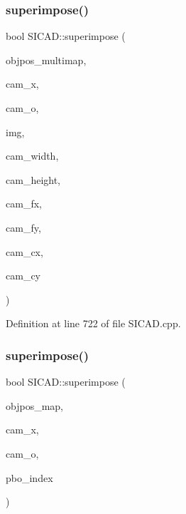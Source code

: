 \subsubsection{\texorpdfstring{superimpose()}{superimpose()}\hspace{0.1cm}{\footnotesize\ttfamily [4/8]}}
{\footnotesize\ttfamily bool S\+I\+C\+A\+D\+::superimpose (\begin{DoxyParamCaption}\item[{const std\+::vector$<$ \mbox{\hyperlink{classSuperimpose_a178e3d4e2def6635bfcf9454dd4b5d22}{Model\+Pose\+Container}} $>$ \&}]{objpos\+\_\+multimap,  }\item[{const double $\ast$}]{cam\+\_\+x,  }\item[{const double $\ast$}]{cam\+\_\+o,  }\item[{cv\+::\+Mat \&}]{img,  }\item[{const G\+Lsizei}]{cam\+\_\+width,  }\item[{const G\+Lsizei}]{cam\+\_\+height,  }\item[{const G\+Lfloat}]{cam\+\_\+fx,  }\item[{const G\+Lfloat}]{cam\+\_\+fy,  }\item[{const G\+Lfloat}]{cam\+\_\+cx,  }\item[{const G\+Lfloat}]{cam\+\_\+cy }\end{DoxyParamCaption})\hspace{0.3cm}{\ttfamily [virtual]}}



Definition at line 722 of file S\+I\+C\+A\+D.\+cpp.

\mbox{\label{classSICAD_a5a76058edfdeed2b37b40bde2eec3db1}} 
\subsubsection{\texorpdfstring{superimpose()}{superimpose()}\hspace{0.1cm}{\footnotesize\ttfamily [5/8]}}
{\footnotesize\ttfamily bool S\+I\+C\+A\+D\+::superimpose (\begin{DoxyParamCaption}\item[{const \mbox{\hyperlink{classSuperimpose_a178e3d4e2def6635bfcf9454dd4b5d22}{Model\+Pose\+Container}} \&}]{objpos\+\_\+map,  }\item[{const double $\ast$}]{cam\+\_\+x,  }\item[{const double $\ast$}]{cam\+\_\+o,  }\item[{const size\+\_\+t}]{pbo\+\_\+index }\end{DoxyParamCaption})\hspace{0.3cm}{\ttfamily [virtual]}}



